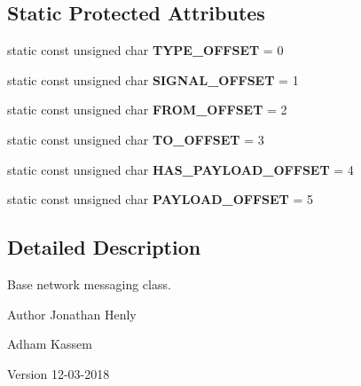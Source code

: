 \subsection*{Static Protected Attributes}
\begin{DoxyCompactItemize}
\item 
\mbox{\label{classbattleship_1_1network__message_1_1message_af14888193de7e2a1fc8309301ae903bd}} 
static const unsigned char {\bfseries T\+Y\+P\+E\+\_\+\+O\+F\+F\+S\+ET} = 0
\item 
\mbox{\label{classbattleship_1_1network__message_1_1message_a3b8b9ed0e5af5e4af3182d4380d7e13f}} 
static const unsigned char {\bfseries S\+I\+G\+N\+A\+L\+\_\+\+O\+F\+F\+S\+ET} = 1
\item 
\mbox{\label{classbattleship_1_1network__message_1_1message_ac5e61619d74437ba3debfd7eac03b1d6}} 
static const unsigned char {\bfseries F\+R\+O\+M\+\_\+\+O\+F\+F\+S\+ET} = 2
\item 
\mbox{\label{classbattleship_1_1network__message_1_1message_a692694320d13692d056e7c859758d38f}} 
static const unsigned char {\bfseries T\+O\+\_\+\+O\+F\+F\+S\+ET} = 3
\item 
\mbox{\label{classbattleship_1_1network__message_1_1message_aa44f97189eacff487d14b54b469e40d7}} 
static const unsigned char {\bfseries H\+A\+S\+\_\+\+P\+A\+Y\+L\+O\+A\+D\+\_\+\+O\+F\+F\+S\+ET} = 4
\item 
\mbox{\label{classbattleship_1_1network__message_1_1message_adbbec67faaa06ff9bbb8defbff091f44}} 
static const unsigned char {\bfseries P\+A\+Y\+L\+O\+A\+D\+\_\+\+O\+F\+F\+S\+ET} = 5
\end{DoxyCompactItemize}


\subsection{Detailed Description}
Base network messaging class. 

\begin{DoxyAuthor}{Author}
Jonathan Henly 

Adham Kassem 
\end{DoxyAuthor}
\begin{DoxyVersion}{Version}
12-\/03-\/2018 
\end{DoxyVersion}


